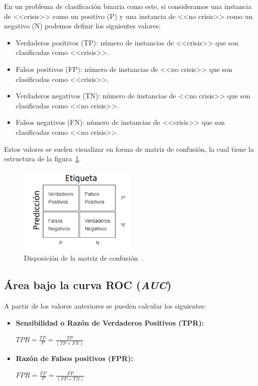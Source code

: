 En un problema de clasificación binaria como este, si consideramos una instancia de <<crisis>> como un positivo (P) y una instancia de <<no crisis>> como un negativo (N) podemos definir los siguientes valores: 

\begin{itemize}
	\item Verdaderos positivos (TP): número de instancias de <<crisis>> que son clasificadas como <<crisis>>. 
	\item Falsos positivos (FP): número de instancias de <<no crisis>> que son clasificadas como <<crisis>>. 
	\item Verdaderos negativos (TN): número de instancias de <<no crisis>> que son clasificadas como <<no crisis>>. 
	\item Falsos negativos (FN): número de instancias de <<crisis>> que son clasificadas como <<no crisis>>.  
\end{itemize}

Estos valores se suelen visualizar en forma de matriz de confusión, la cual tiene la estructura de la figura~\ref{fig:matrizconfusion}.

\begin{figure}[H]
	\centering
	\includegraphics[width=0.5\textwidth]{../img/matrizconfusion.png}
	\caption[Disposición de la matriz de confusión.]{Disposición de la matriz de confusión~\cite{wiki:roc}.}
	\label{fig:matrizconfusion}
\end{figure}  

\subsection{Área bajo la curva ROC (\textit{AUC})}

A partir de los valores anteriores se pueden calcular los siguientes: 

\begin{itemize}
	\item \textbf{Sensibilidad o Razón de Verdaderos Positivos (TPR):}
	\begin{center}
		$TPR=\frac{TP}{P}=\frac{TP}{(TP+FN)}$ 
	\end{center} 
	\item \textbf{Razón de Falsos positivos (FPR):} 
	\begin{center}
		$FPR=\frac{FP}{P}=\frac{FP}{(FP+TN)}$ 
	\end{center} 
\end{itemize}

